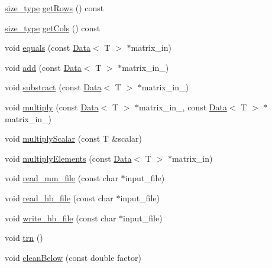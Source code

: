 \begin{DoxyCompactItemize}
\item 
\hyperlink{lmx__mat__data_8h_a49b489a408a211a90e766329c0732d7b}{size\-\_\-type} \hyperlink{classlmx_1_1Type__stdmatrix_a894217af1bea253ba832af0369edc87d}{get\-Rows} () const 
\item 
\hyperlink{lmx__mat__data_8h_a49b489a408a211a90e766329c0732d7b}{size\-\_\-type} \hyperlink{classlmx_1_1Type__stdmatrix_a54d79383c4486c1eb457a1aec6f93689}{get\-Cols} () const 
\item 
void \hyperlink{classlmx_1_1Type__stdmatrix_abc40ccc0128617c4bbea2d3eeb5c695c}{equals} (const \hyperlink{classlmx_1_1Data}{Data}$<$ T $>$ $\ast$matrix\-\_\-in)
\item 
void \hyperlink{classlmx_1_1Type__stdmatrix_a0e3195992632635c8e050ff63fba8a1b}{add} (const \hyperlink{classlmx_1_1Data}{Data}$<$ T $>$ $\ast$matrix\-\_\-in\-\_)
\item 
void \hyperlink{classlmx_1_1Type__stdmatrix_a0ee06b70a259e488d6ac3ef53c8f68d9}{substract} (const \hyperlink{classlmx_1_1Data}{Data}$<$ T $>$ $\ast$matrix\-\_\-in\-\_)
\item 
void \hyperlink{classlmx_1_1Type__stdmatrix_a8cbc8c7b5e6ebe241e08c783b13c76b8}{multiply} (const \hyperlink{classlmx_1_1Data}{Data}$<$ T $>$ $\ast$matrix\-\_\-in\-\_, const \hyperlink{classlmx_1_1Data}{Data}$<$ T $>$ $\ast$matrix\-\_\-in\-\_)
\item 
void \hyperlink{classlmx_1_1Type__stdmatrix_ab36305d296f62f54bc36f49ee51c6922}{multiply\-Scalar} (const T \&scalar)
\item 
void \hyperlink{classlmx_1_1Type__stdmatrix_a2001b3ba02dab4b5574076d4c58ac274}{multiply\-Elements} (const \hyperlink{classlmx_1_1Data}{Data}$<$ T $>$ $\ast$matrix\-\_\-in)
\item 
void \hyperlink{classlmx_1_1Type__stdmatrix_a5ba470e3a7685ee2b93fc0be6c03ba4f}{read\-\_\-mm\-\_\-file} (const char $\ast$input\-\_\-file)
\item 
void \hyperlink{classlmx_1_1Type__stdmatrix_a058d9102e67410c92e9cb149c602a088}{read\-\_\-hb\-\_\-file} (const char $\ast$input\-\_\-file)
\item 
void \hyperlink{classlmx_1_1Type__stdmatrix_a9f4735df0b49f3b4474bb81583781b66}{write\-\_\-hb\-\_\-file} (const char $\ast$input\-\_\-file)
\item 
void \hyperlink{classlmx_1_1Type__stdmatrix_a979ecbde1ba4097db9c5e0d92473efe0}{trn} ()
\item 
void \hyperlink{classlmx_1_1Type__stdmatrix_ac83e09e52bf7fa7a82d7ca4dcb10f9de}{clean\-Below} (const double factor)

\end{DoxyCompactItemize}
